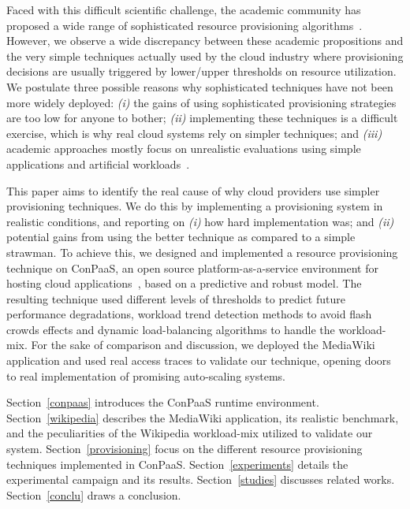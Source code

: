 Faced with this difficult scientific challenge, the academic community
has proposed a wide range of sophisticated resource provisioning
algorithms~\cite{xxx,yyy,zzz}. However, we observe a wide discrepancy
between these academic propositions and the very simple techniques
actually used by the cloud industry where provisioning decisions are
usually triggered by lower/upper thresholds on resource
utilization. We postulate three possible reasons why sophisticated
techniques have not been more widely deployed: \emph{(i)} the gains of
using sophisticated provisioning strategies are too low for anyone to
bother; \emph{(ii)} implementing these techniques is a difficult
exercise, which is why real cloud systems rely on simpler techniques;
and \emph{(iii)} academic approaches mostly focus on unrealistic
evaluations using simple applications and artificial
workloads~\cite{do_profiling_2011, islam_empirical_2012,
wang_appraise:_2009}. %


This paper aims to identify the real cause of why cloud providers use simpler provisioning techniques. We do this by implementing a provisioning system in realistic conditions, and reporting on \emph{(i)} how hard implementation was; and \emph{(ii)} potential gains from using the better technique as compared to a simple strawman. To achieve this, we designed and implemented a resource provisioning technique on ConPaaS, an open source platform-as-a-service environment for hosting cloud applications~\cite{conpaasIC}, based on a predictive and robust model. The resulting technique used different levels of thresholds to predict future performance degradations, workload trend detection methods to avoid flash crowds effects and dynamic load-balancing algorithms to handle the workload-mix. For the sake of comparison and discussion, we deployed the MediaWiki application and used real access traces to validate our technique, opening doors to real implementation of promising auto-scaling systems.


Section~\ref{conpaas} introduces the ConPaaS runtime environment. Section~\ref{wikipedia} describes the MediaWiki application, its realistic benchmark, and the peculiarities of the Wikipedia workload-mix utilized to validate our system. Section~\ref{provisioning} focus on the different resource provisioning techniques implemented in ConPaaS. Section~\ref{experiments} details the experimental campaign and its results. Section~\ref{studies} discusses related works. Section~\ref{conclu} draws a conclusion.

